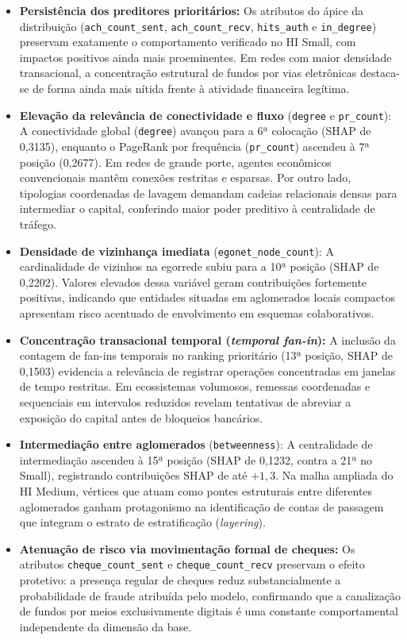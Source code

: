 \documentclass[titlepage,a4paper,oneside,onecolumn,12pt]{report}
\begin{document}
\begin{itemize}
    \item \textbf{Persistência dos preditores prioritários:} Os atributos do ápice da distribuição (\texttt{ach\_count\_sent}, \texttt{ach\_count\_recv}, \texttt{hits\_auth} e \texttt{in\_degree}) preservam exatamente o comportamento verificado no HI Small, com impactos positivos ainda mais proeminentes. Em redes com maior densidade transacional, a concentração estrutural de fundos por vias eletrônicas destaca-se de forma ainda mais nítida frente à atividade financeira legítima.

    \item \textbf{Elevação da relevância de conectividade e fluxo} (\texttt{degree} e \texttt{pr\_count}): A conectividade global (\texttt{degree}) avançou para a 6ª colocação (SHAP de 0,3135), enquanto o PageRank por frequência (\texttt{pr\_count}) ascendeu à 7ª posição (0,2677). Em redes de grande porte, agentes econômicos convencionais mantêm conexões restritas e esparsas. Por outro lado, tipologias coordenadas de lavagem demandam cadeias relacionais densas para intermediar o capital, conferindo maior poder preditivo à centralidade de tráfego.

    \item \textbf{Densidade de vizinhança imediata} (\texttt{egonet\_node\_count}): A cardinalidade de vizinhos na egorrede subiu para a 10ª posição (SHAP de 0,2202). Valores elevados dessa variável geram contribuições fortemente positivas, indicando que entidades situadas em aglomerados locais compactos apresentam risco acentuado de envolvimento em esquemas colaborativos.

    \item \textbf{Concentração transacional temporal (\textit{temporal fan-in}):} A inclusão da contagem de fan-ins temporais no ranking prioritário (13ª posição, SHAP de 0,1503) evidencia a relevância de registrar operações concentradas em janelas de tempo restritas. Em ecossistemas volumosos, remessas coordenadas e sequenciais em intervalos reduzidos revelam tentativas de abreviar a exposição do capital antes de bloqueios bancários.

    \item \textbf{Intermediação entre aglomerados} (\texttt{betweenness}): A centralidade de intermediação ascendeu à 15ª posição (SHAP de 0,1232, contra a 21ª no Small), registrando contribuições SHAP de até $+1{,}3$. Na malha ampliada do HI Medium, vértices que atuam como pontes estruturais entre diferentes aglomerados ganham protagonismo na identificação de contas de passagem que integram o estrato de estratificação (\textit{layering}).

    \item \textbf{Atenuação de risco via movimentação formal de cheques:} Os atributos \texttt{cheque\_count\_sent} e \texttt{cheque\_count\_recv} preservam o efeito protetivo: a presença regular de cheques reduz substancialmente a probabilidade de fraude atribuída pelo modelo, confirmando que a canalização de fundos por meios exclusivamente digitais é uma constante comportamental independente da dimensão da base.
\end{itemize}
\end{document}
